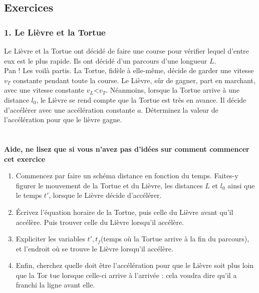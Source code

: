 \documentclass[a4paper,10pt,twoside]{article}
\begin{document}
\subsection*{Exercices}
\subsubsection*{1. Le Lièvre et la Tortue}
    Le Lièvre et la Tortue ont décidé de faire une course pour vérifier lequel d'entre eux est le plus rapide. Ils ont décidé d'un parcours d'une longueur $L$. \\
    Pan ! Les voilà partis. La Tortue, fidèle à elle-même, décide de garder une vitesse $v_T$ constante pendant toute la course. Le Lièvre, sûr de gagner, part en marchant, avec une vitesse constante $v_L$<$v_T$. Néanmoins, lorsque la Tortue arrive à une distance $l_0$, le Lièvre se rend compte que la Tortue est très en avance. Il décide d'accélérer avec une accélération constante $a$. Déterminez la valeur de l'accélération pour que le lièvre gagne. 
    \\ 
    \\
    \\
    \textbf{Aide, ne lisez que si vous n'avez pas d'idées sur comment commencer cet exercice}\\
    \begin{enumerate}
    \item Commencez par faire un schéma distance en fonction du temps. Faites-y figurer le mouvement de la Tortue et du Lièvre, les distances $L$ et $l_0$ ainsi que le temps $t'$, lorsque le Lièvre décide d'accélérer.
    \item Écrivez l'équation horaire de la Tortue, puis celle du Lièvre avant qu'il accélère. Puis trouver celle du Lièvre lorsqu'il accélère. 
    \item Expliciter les variables $t', t_f$(temps où la Tortue arrive à la fin du parcours), et l'endroit où se trouve le Lièvre lorsqu'il accélère. 
    \item Enfin, cherchez quelle doit être l'accélération pour que le Lièvre soit plus loin que la Tor tue lorsque celle-ci arrive à l'arrivée : cela voudra dire qu'il a franchi la ligne avant elle.
\end{enumerate}
\end{document}
